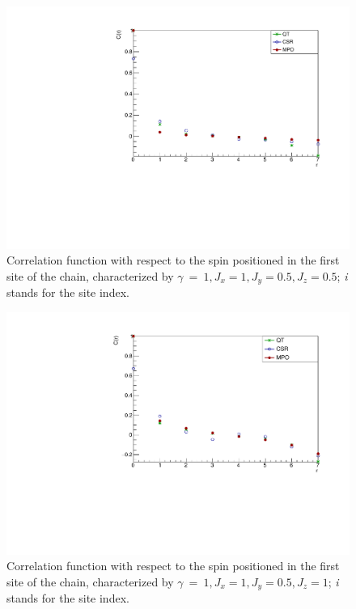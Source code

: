 \begin{figure}[H]
    \centering
    \includegraphics[scale=0.7]{Figures/8sites_comparison/CorrFunc1_8s_J10505.pdf}
    \caption{Correlation function with respect to the spin positioned in the first site of the chain, characterized by $\gamma~=~1, J_x=1, J_y=0.5, J_z=0.5$; \emph{i} stands for the site index.}
    \label{fig:my_label}
\end{figure}

\begin{figure}[H]
    \centering
    \includegraphics[scale=0.7]{Figures/8sites_comparison/CorrFunc1_8s_J1051.pdf}
    \caption{Correlation function with respect to the spin positioned in the first site of the chain, characterized by $\gamma~=~1, J_x=1, J_y=0.5, J_z=1$; \emph{i} stands for the site index.}
    \label{fig:my_label}
\end{figure}

